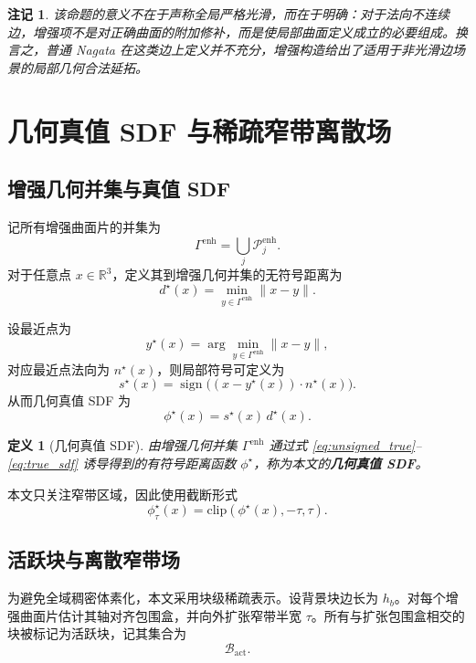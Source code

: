 \documentclass[11pt,a4paper]{ctexart}
\newtheorem{definition}{定义}
\newtheorem{remark}{注记}
\begin{document}
\begin{remark}
该命题的意义不在于声称全局严格光滑，而在于明确：对于法向不连续边，增强项不是对正确曲面的附加修补，而是使局部曲面定义成立的必要组成。换言之，普通 Nagata 在这类边上定义并不充分，增强构造给出了适用于非光滑边场景的局部几何合法延拓。
\end{remark}

\section{几何真值 SDF 与稀疏窄带离散场}

\subsection{增强几何并集与真值 SDF}
记所有增强曲面片的并集为
\[
\Gamma^{\mathrm{enh}}=\bigcup_j \mathcal{P}^{\mathrm{enh}}_j.
\]
对于任意点 $x\in\mathbb{R}^3$，定义其到增强几何并集的无符号距离为
\begin{equation}
d^{\star}(x)=\min_{y\in\Gamma^{\mathrm{enh}}}\|x-y\|.
\label{eq:unsigned_true}
\end{equation}

设最近点为
\[
y^{\star}(x)=\arg\min_{y\in\Gamma^{\mathrm{enh}}}\|x-y\|,
\]
对应最近点法向为 $n^{\star}(x)$，则局部符号可定义为
\begin{equation}
s^{\star}(x)=\operatorname{sign}\big((x-y^{\star}(x))\cdot n^{\star}(x)\big).
\label{eq:sign_true}
\end{equation}
从而几何真值 SDF 为
\begin{equation}
\phi^{\star}(x)=s^{\star}(x)\,d^{\star}(x).
\label{eq:true_sdf}
\end{equation}

\begin{definition}[几何真值 SDF]
由增强几何并集 $\Gamma^{\mathrm{enh}}$ 通过式 \eqref{eq:unsigned_true}--\eqref{eq:true_sdf} 诱导得到的有符号距离函数 $\phi^{\star}$，称为本文的\textbf{几何真值 SDF}。
\end{definition}

本文只关注窄带区域，因此使用截断形式
\begin{equation}
\phi^{\star}_{\tau}(x)=\mathrm{clip}(\phi^{\star}(x),-\tau,\tau).
\label{eq:true_trunc_sdf}
\end{equation}

\subsection{活跃块与离散窄带场}
为避免全域稠密体素化，本文采用块级稀疏表示。设背景块边长为 $h_b$。对每个增强曲面片估计其轴对齐包围盒，并向外扩张窄带半宽 $\tau$。所有与扩张包围盒相交的块被标记为活跃块，记其集合为
\[
\mathcal{B}_{\mathrm{act}}.
\]
\end{document}
